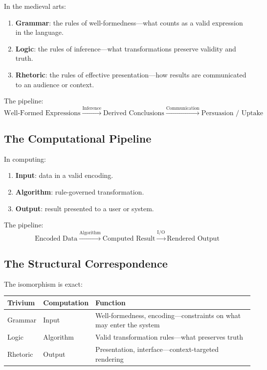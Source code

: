 \documentclass[12pt, letterpaper]{book}
\begin{document}
In the medieval arts:
\begin{enumerate}[label=(\roman*)]
    \item \textbf{Grammar}: the rules of well-formedness---what counts as a valid expression in the language.
    \item \textbf{Logic}: the rules of inference---what transformations preserve validity and truth.
    \item \textbf{Rhetoric}: the rules of effective presentation---how results are communicated to an audience or context.
\end{enumerate}

The pipeline:
\[
\text{Well-Formed Expressions} \xrightarrow{\text{Inference}} \text{Derived Conclusions} \xrightarrow{\text{Communication}} \text{Persuasion / Uptake}
\]

\subsection{The Computational Pipeline}

In computing:
\begin{enumerate}[label=(\roman*)]
    \item \textbf{Input}: data in a valid encoding.
    \item \textbf{Algorithm}: rule-governed transformation.
    \item \textbf{Output}: result presented to a user or system.
\end{enumerate}

The pipeline:
\[
\text{Encoded Data} \xrightarrow{\text{Algorithm}} \text{Computed Result} \xrightarrow{\text{I/O}} \text{Rendered Output}
\]

\subsection{The Structural Correspondence}

The isomorphism is exact:

\begin{center}
\begin{tabular}{llp{7cm}}
\toprule
\textbf{Trivium} & \textbf{Computation} & \textbf{Function} \\
\midrule
Grammar & Input & Well-formedness, encoding---constraints on what may enter the system \\
Logic & Algorithm & Valid transformation rules---what preserves truth \\
Rhetoric & Output & Presentation, interface---context-targeted rendering \\
\bottomrule
\end{tabular}
\end{center}
\end{document}
